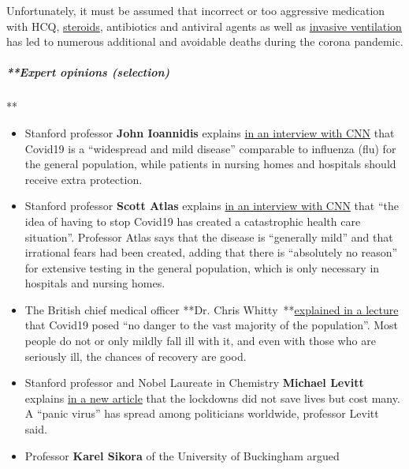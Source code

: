 Unfortunately, it must be assumed that incorrect or too aggressive
medication with HCQ,
\href{https://www.sciencedaily.com/releases/2020/02/200206110703.htm}{steroids},
antibiotics and antiviral agents as well as
\href{https://nypost.com/2020/05/29/northwell-health-probing-use-of-ventilators-for-covid-patients/}{invasive
ventilation} has led to numerous additional and avoidable deaths during
the corona pandemic.

\hypertarget{expert-opinions-selection}{%
\subparagraph{**Expert opinions
(selection)}\label{expert-opinions-selection}}

**

\begin{itemize}
\tightlist
\item
  Stanford professor \textbf{John Ioannidis} explains
  \href{https://twitter.com/cnn/status/1256579248342564865}{in an
  interview with CNN} that Covid19 is a ``widespread and mild disease''
  comparable to influenza (flu) for the general population, while
  patients in nursing homes and hospitals should receive extra
  protection.
\item
  Stanford professor \textbf{Scott Atlas} explains
  \href{https://www.facebook.com/cnn/posts/10160799274796509}{in an
  interview with CNN} that ``the idea of having to stop Covid19 has
  created a catastrophic health care situation''. Professor Atlas says
  that the disease is ``generally mild'' and that irrational fears had
  been created, adding that there is ``absolutely no reason'' for
  extensive testing in the general population, which is only necessary
  in hospitals and nursing homes.
\item
  The British chief medical officer **Dr. Chris
  Whitty~**\href{https://off-guardian.org/2020/05/15/watch-uk-chief-medic-confirms-again-covid19-harmless-to-vast-majority/}{explained
  in a lecture} that Covid19 posed ``no danger to the vast majority of
  the population''. Most people do not or only mildly fall ill with it,
  and even with those who are seriously ill, the chances of recovery are
  good.
\item
  Stanford professor and Nobel Laureate in Chemistry \textbf{Michael
  Levitt} explains
  \href{https://www.telegraph.co.uk/news/2020/05/23/lockdown-saved-no-lives-may-have-cost-nobel-prize-winner-believes/}{in
  a new article} that the lockdowns did not save lives but cost many. A
  ``panic virus'' has spread among politicians worldwide, professor
  Levitt said.
\item
  Professor \textbf{Karel Sikora} of the University of Buckingham argued

\end{itemize}
